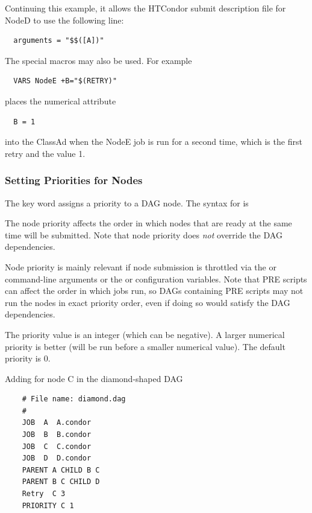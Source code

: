 Continuing this example,
it allows the HTCondor submit description file for NodeD to use
the following line:
\begin{verbatim}
  arguments = "$$([A])"
\end{verbatim}

The special macros may also be used.
For example
\begin{verbatim}
  VARS NodeE +B="$(RETRY)"
\end{verbatim}
places the numerical attribute
\begin{verbatim}
  B = 1
\end{verbatim}
into the ClassAd when the NodeE job is run for a second time,
which is the first retry and the value 1. 

\subsubsection{Setting Priorities for Nodes}

The  key word assigns a priority to a DAG node.
The syntax for  is

  

The node priority affects the order in which nodes that are ready
at the same time will be submitted.  Note that node priority does
\emph{not} override the DAG dependencies.

Node priority is mainly relevant if
node submission is throttled via the  or 
command-line arguments or the  or
 configuration variables.  Note that PRE
scripts can affect the order in which jobs run, so DAGs containing
PRE scripts may not run the nodes in exact priority order, even if
doing so would satisfy the DAG dependencies.

The priority value is an integer (which can be negative).  A larger
numerical priority is better (will be run before a smaller numerical
value).  The default priority is 0.

Adding  for node C in the diamond-shaped
DAG
\footnotesize
\begin{verbatim}
    # File name: diamond.dag
    #
    JOB  A  A.condor 
    JOB  B  B.condor 
    JOB  C  C.condor	
    JOB  D  D.condor
    PARENT A CHILD B C
    PARENT B C CHILD D
    Retry  C 3
    PRIORITY C 1
\end{verbatim}
\normalsize


